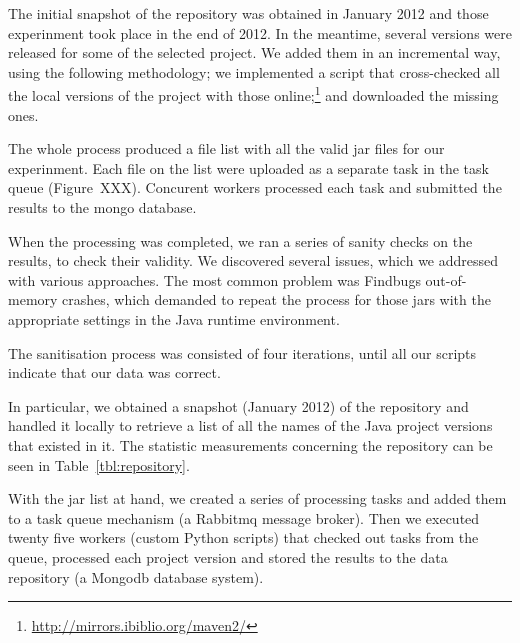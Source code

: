 \documentclass{sig-alternate}
\begin{document}
The initial snapshot of the repository was obtained in January 2012 and those experinment took
place in the end of 2012. In the meantime, several versions were released for some of the selected project.
We added them in an incremental way, using the following methodology; we implemented a script that cross-checked 
all the local versions of the project with those online;\footnote{\url{http://mirrors.ibiblio.org/maven2/}} and downloaded
the missing ones.

The whole process produced a file list with all the valid {\sc jar} files for our experinment. Each file on the list were uploaded as a separate task in the task queue (Figure~XXX). Concurent workers processed each task and submitted the results to the mongo database.

When the processing was completed, we ran a series of sanity checks on the results, to check their validity. We discovered several issues, which we addressed with various approaches. The most common problem was Findbugs out-of-memory crashes, which demanded to repeat the process for those {\sc jar}s with the appropriate settings in the Java runtime environment.

The sanitisation process was consisted of four iterations, until all our scripts indicate that our data was correct.

In particular, we obtained a snapshot (January 2012) of
the repository and handled it locally to retrieve a list of all
the names of the Java project versions that existed in it.
The statistic measurements concerning the repository can be seen in 
Table~\ref{tbl:repository}.

With the {\sc jar} list at hand, we created a series of processing tasks
and added them to a task queue mechanism (a Rabbit{\sc mq} message
broker). Then we executed twenty five workers (custom Python scripts)
that checked out tasks from the queue, processed each project version
and stored the results to the data
repository (a Mongo{\sc db} database system).
\end{document}
